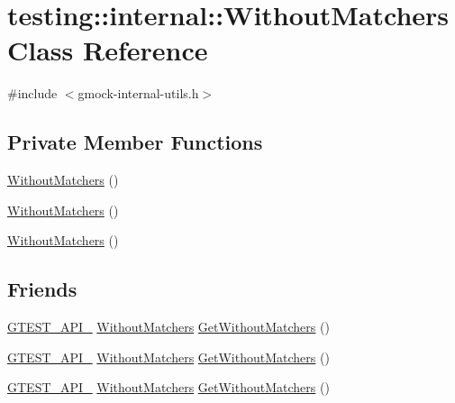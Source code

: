 \hypertarget{classtesting_1_1internal_1_1_without_matchers}{}\section{testing\+::internal\+::Without\+Matchers Class Reference}
\label{classtesting_1_1internal_1_1_without_matchers}


{\ttfamily \#include $<$gmock-\/internal-\/utils.\+h$>$}

\subsection*{Private Member Functions}
\begin{DoxyCompactItemize}
\item 
\mbox{\hyperlink{classtesting_1_1internal_1_1_without_matchers_ab4bc9ba864d2daed9c186e7d472dfaed}{Without\+Matchers}} ()
\item 
\mbox{\hyperlink{classtesting_1_1internal_1_1_without_matchers_ab4bc9ba864d2daed9c186e7d472dfaed}{Without\+Matchers}} ()
\item 
\mbox{\hyperlink{classtesting_1_1internal_1_1_without_matchers_ab4bc9ba864d2daed9c186e7d472dfaed}{Without\+Matchers}} ()
\end{DoxyCompactItemize}
\subsection*{Friends}
\begin{DoxyCompactItemize}
\item 
\mbox{\hyperlink{_obj__test_2lib_2googletest-release-1_88_81_2googletest_2include_2gtest_2internal_2gtest-port_8h_aa73be6f0ba4a7456180a94904ce17790}{G\+T\+E\+S\+T\+\_\+\+A\+P\+I\+\_\+}} \mbox{\hyperlink{classtesting_1_1internal_1_1_without_matchers}{Without\+Matchers}} \mbox{\hyperlink{classtesting_1_1internal_1_1_without_matchers_aec6c0de08b3c9096e2365c023664a848}{Get\+Without\+Matchers}} ()
\item 
\mbox{\hyperlink{_obj__test_2lib_2googletest-release-1_88_81_2googletest_2include_2gtest_2internal_2gtest-port_8h_aa73be6f0ba4a7456180a94904ce17790}{G\+T\+E\+S\+T\+\_\+\+A\+P\+I\+\_\+}} \mbox{\hyperlink{classtesting_1_1internal_1_1_without_matchers}{Without\+Matchers}} \mbox{\hyperlink{classtesting_1_1internal_1_1_without_matchers_aec6c0de08b3c9096e2365c023664a848}{Get\+Without\+Matchers}} ()
\item 
\mbox{\hyperlink{_obj__test_2lib_2googletest-release-1_88_81_2googletest_2include_2gtest_2internal_2gtest-port_8h_aa73be6f0ba4a7456180a94904ce17790}{G\+T\+E\+S\+T\+\_\+\+A\+P\+I\+\_\+}} \mbox{\hyperlink{classtesting_1_1internal_1_1_without_matchers}{Without\+Matchers}} \mbox{\hyperlink{classtesting_1_1internal_1_1_without_matchers_aec6c0de08b3c9096e2365c023664a848}{Get\+Without\+Matchers}} ()
\end{DoxyCompactItemize}


